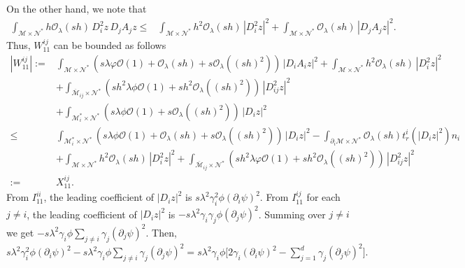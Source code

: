 \documentclass[11pt,oneside,leqno]{amsart}
\numberwithin{equation}{section}
\numberwithin{equation}{section}
\begin{document}
\par On the other hand, we note that 
\begin{equation}
    \begin{split}
        \int_{\mathcal{M}\times\mathcal{N}^{\ast}}h\mathcal{O}_{\lambda}(sh)\,D_{i}^{2}z\,D_{j}A_{j}z\leq &\int_{\mathcal{M}\times\mathcal{N}^{\ast}}h^{2}\mathcal{O}_{\lambda}(sh)\,|D_{i}^{2}z|^{2}+\int_{\mathcal{M}\times\mathcal{N}^{\ast}}\mathcal{O}_{\lambda}(sh)\,|D_{j}A_{j}z|^{2}.
    \end{split}
\end{equation}
Thus, $W_{11}^{ij}$ can be bounded as follows
\begin{equation}
\begin{split}
    |W_{11}^{ij}|:=&\int_{\mathcal{M}\times\mathcal{N}^{\ast}}\left(s\lambda\varphi\mathcal{O}(1)+\mathcal{O}_{\lambda}(sh)+s\mathcal{O}_{\lambda}((sh)^{2})\right)\,|D_{i}A_{i}z|^{2}+\int_{\mathcal{M}\times\mathcal{N}^{\ast}}h^{2}\mathcal{O}_{\lambda}(sh)\,|D_{i}^{2}z|^{2}\\
    &+\int_{\overline{\mathcal{M}}_{ij}\times\mathcal{N}^{\ast}}\left(sh^{2}\lambda\phi\mathcal{O}(1)+sh^{2}\mathcal{O}_{\lambda}((sh)^{2})\right)\,|D_{ij}^{2}z|^{2}\\
    &+\int_{\mathcal{M}^{\ast}_{i}\times\mathcal{N}^{\ast}}(s\lambda\phi\mathcal{O}(1)+s\mathcal{O}_{\lambda}((sh)^{2}))\, |D_{i}z|^{2}\\
    \leq &\int_{\mathcal{M}_{i}^{\ast}\times\mathcal{N}^{\ast}}\left(s\lambda\phi\mathcal{O}(1)+\mathcal{O}_{\lambda}(sh)+s\mathcal{O}_{\lambda}((sh)^{2})\right)\,|D_{i}z|^{2}-\int_{\partial_{i}\mathcal{M}\times\mathcal{N}^{\ast}}\mathcal{O}_{\lambda}(sh)t_{r}^{i}(|D_{i}z|^{2})n_{i}\\
    &+\int_{\mathcal{M}\times\mathcal{N}^{\ast}}h^{2}\mathcal{O}_{\lambda}(sh)\,|D_{i}^{2}z|^{2}+\int_{\overline{\mathcal{M}}_{ij}\times\mathcal{N}^{\ast}}\left(sh^{2}\lambda\varphi\mathcal{O}(1)+sh^{2}\mathcal{O}_{\lambda}((sh)^{2})\right)\,|D_{ij}^{2}z|^{2}\\
    :=&X_{11}^{ij}.
    \end{split}
\end{equation}
From $I_{11}^{ii}$, the leading coefficient of $|D_{i}z|^{2}$ is $s\lambda^{2}\gamma_{i}^{2}\phi(\partial_{i}\psi)^{2}$. From $I_{11}^{ij}$ for each $j\ne i$, the leading coefficient of $|D_{i}z|^{2}$ is $
    -s\lambda^{2}\gamma_{i}\gamma_{j}\phi(\partial_{j}\psi)^{2}$.
Summing over $j\ne i$ we get 
$\displaystyle
    -s\lambda^{2}\gamma_{i}\phi\sum_{j\ne i}\gamma_{j}(\partial_{j}\psi)^{2}$. Then, $\displaystyle s\lambda^{2}\gamma_{i}^{2}\phi(\partial_{i}\psi)^{2}-s\lambda^{2}\gamma_{i}\phi\sum_{j\ne i}\gamma_{j}(\partial_{j}\psi)^{2}=s\lambda^{2}\gamma_{i}\phi\bigg[2\gamma_{i}(\partial_{i}\psi)^{2}-\sum_{j=1}^{d}\gamma_{j}(\partial_{j}\psi)^{2}\bigg].$
\end{document}
